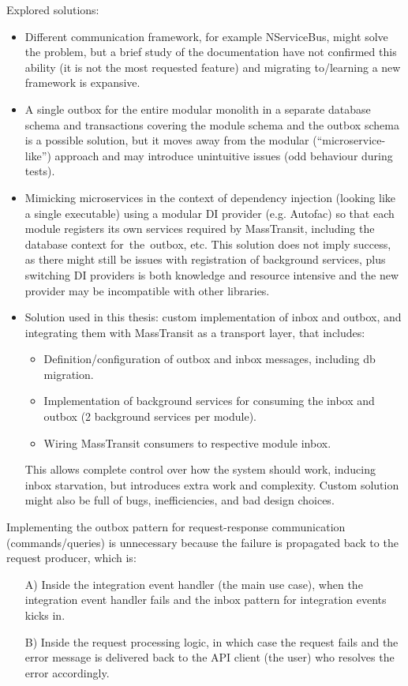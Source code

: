 Explored solutions:
\begin{itemize}
    \item Different communication framework, for example NServiceBus, might solve the problem, but a brief study of the documentation have not confirmed this ability (it is not the most requested feature) and migrating to/learning a new framework is expansive.

    \item A single outbox for the entire modular monolith in a separate database schema and transactions covering the module schema and the outbox schema is a possible solution, but it moves away from the modular (``microservice-like'') approach and may introduce unintuitive issues (odd behaviour during tests).

    \item Mimicking microservices in the context of dependency injection (looking like a single executable) using a modular DI provider (e.g. Autofac) so that each module registers its own services required by MassTransit, including the database context for~the~outbox, etc. This solution does not imply success, as there might still be issues with registration of background services, plus switching DI providers is both knowledge and resource intensive and the new provider may be incompatible with other libraries.

    \item Solution used in this thesis: custom implementation of inbox and outbox, and integrating them with MassTransit as a transport layer, that includes:
    \begin{itemize}
        \item Definition/configuration of outbox and inbox messages, including db migration.
        \item Implementation of background services for consuming the inbox and outbox (2 background services per module).
        \item Wiring MassTransit consumers to respective module inbox.
    \end{itemize}

    This allows complete control over how the system should work, inducing inbox starvation, but introduces extra work and complexity. Custom solution might also be full of bugs, inefficiencies, and bad design choices.
\end{itemize}

Implementing the outbox pattern for request-response communication (commands/queries) is unnecessary because the failure is propagated back to the request producer, which is:
\begin{itemize}
    \item[A)] Inside the integration event handler (the main use case), when the integration event handler fails and the inbox pattern for integration events kicks in.
    
    \item[B)] Inside the request processing logic, in which case the request fails and the error message is delivered back to the API client (the user) who resolves the error accordingly.
\end{itemize}

